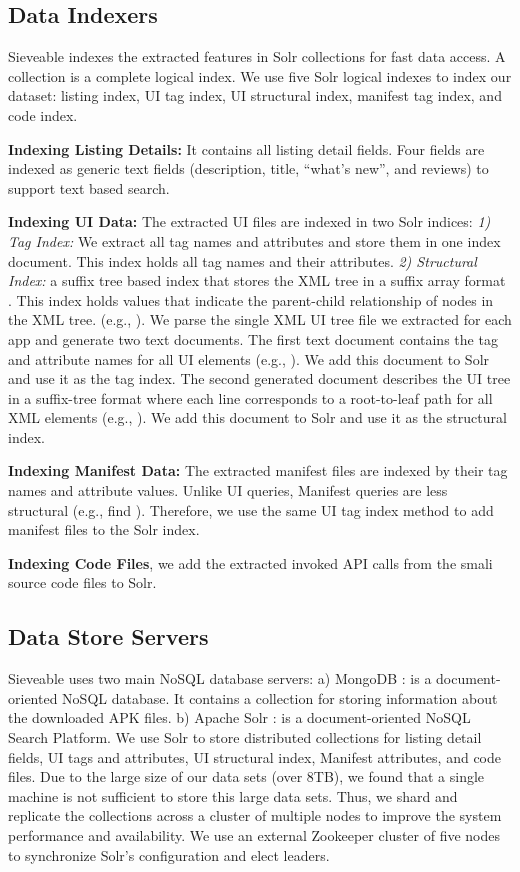 \subsection{Data Indexers}
Sieveable indexes the extracted features in Solr collections for fast data access.
A collection is a complete logical index.
We use five Solr logical indexes to index our dataset: listing index, UI tag index, UI structural index, manifest tag index, and code index.

\textbf{Indexing Listing Details:} It contains all listing detail fields. Four fields are indexed as generic text fields (description, title, ``what's new'', and reviews) to support text based search.

\textbf{Indexing UI Data:} The extracted UI files are indexed in two Solr indices: \textit{1) Tag Index:} We extract all tag names and attributes and store them in one index document.
This index holds all tag names and their attributes.
\textit{2) Structural Index:} a suffix tree based index that stores the XML tree in a suffix array format \cite{shasha_2002_atreegrep}.
This index holds values that indicate the parent-child relationship of nodes in the XML tree. (e.g., ).
We parse the single XML UI tree file we extracted for each app and generate two text documents. The first text document contains the tag and attribute names for all UI elements (e.g., ).
We add this document to Solr and use it as the tag index.
The second generated document describes the UI tree in a suffix-tree format where each line corresponds to a root-to-leaf path for all XML elements (e.g., ).
We add this document to Solr and use it as the structural index.

\textbf{Indexing Manifest Data:} The extracted manifest files are indexed by their tag names and attribute values.
Unlike UI queries, Manifest queries are less structural (e.g., find ).
Therefore, we use the same UI tag index method to add manifest files to the Solr index.

\textbf{Indexing Code Files}, we add the extracted invoked API calls from the smali source code files to Solr.

\subsection{Data Store Servers}
Sieveable uses two main NoSQL database servers:
a) MongoDB \cite{mongodb}: is a document-oriented NoSQL database. It contains a collection for storing information about the downloaded APK files.
b) Apache Solr \cite{solr}: is a document-oriented NoSQL Search Platform.
We use Solr to store distributed collections for listing detail fields, UI tags and attributes, UI structural index, Manifest attributes, and code files.
Due to the large size of our data sets (over 8TB), we found that a single machine is not sufficient to store this large data sets.
Thus, we shard and replicate the collections across a cluster of multiple nodes to improve the system performance and availability.
We use an external Zookeeper \cite{zookeeper} cluster of five nodes to synchronize Solr's configuration and elect leaders.
